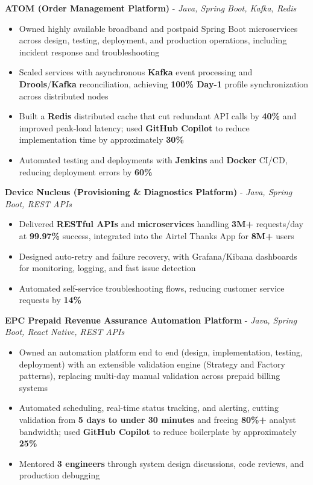\documentclass[letterpaper,10pt]{article}
\newcommand{\resumeItem}[1]{
  \item\small{{#1 \vspace{-2pt}}}
}
\newcommand{\resumeItemListStart}{\begin{itemize}[itemsep=0pt,topsep=2pt,parsep=0pt]}
\newcommand{\resumeItemListEnd}{\end{itemize}\vspace{-5pt}}
\begin{document}
      \vspace{4pt}
      \textbf{\small ATOM (Order Management Platform)} - \textit{\small Java, Spring Boot, Kafka, Redis} \\
      \vspace{-2pt}
      \resumeItemListStart
        \resumeItem{Owned highly available broadband and postpaid Spring Boot microservices across design, testing, deployment, and production operations, including incident response and troubleshooting}
        \resumeItem{Scaled services with asynchronous \textbf{Kafka} event processing and \textbf{Drools}/\textbf{Kafka} reconciliation, achieving \textbf{100\% Day-1} profile synchronization across distributed nodes}
        \resumeItem{Built a \textbf{Redis} distributed cache that cut redundant API calls by \textbf{40\%} and improved peak-load latency; used \textbf{GitHub Copilot} to reduce implementation time by approximately \textbf{30\%}}
        \resumeItem{Automated testing and deployments with \textbf{Jenkins} and \textbf{Docker} CI/CD, reducing deployment errors by \textbf{60\%}}
      \resumeItemListEnd

      \vspace{2pt}
      \textbf{\small Device Nucleus (Provisioning \& Diagnostics Platform)} - \textit{\small Java, Spring Boot, REST APIs} \\
      \vspace{-2pt}
      \resumeItemListStart
        \resumeItem{Delivered \textbf{RESTful APIs} and \textbf{microservices} handling \textbf{3M+} requests/day at \textbf{99.97\%} success, integrated into the Airtel Thanks App for \textbf{8M+} users}
        \resumeItem{Designed auto-retry and failure recovery, with Grafana/Kibana dashboards for monitoring, logging, and fast issue detection}
        \resumeItem{Automated self-service troubleshooting flows, reducing customer service requests by \textbf{14\%}}
      \resumeItemListEnd

      \vspace{2pt}
      \textbf{\small EPC Prepaid Revenue Assurance Automation Platform} - \textit{\small Java, Spring Boot, React Native, REST APIs} \\
      \vspace{-2pt}
      \resumeItemListStart
        \resumeItem{Owned an automation platform end to end (design, implementation, testing, deployment) with an extensible validation engine (Strategy and Factory patterns), replacing multi-day manual validation across prepaid billing systems}
        \resumeItem{Automated scheduling, real-time status tracking, and alerting, cutting validation from \textbf{5 days to under 30 minutes} and freeing \textbf{80\%+} analyst bandwidth; used \textbf{GitHub Copilot} to reduce boilerplate by approximately \textbf{25\%}}
        \resumeItem{Mentored \textbf{3 engineers} through system design discussions, code reviews, and production debugging}
      \resumeItemListEnd
\end{document}
